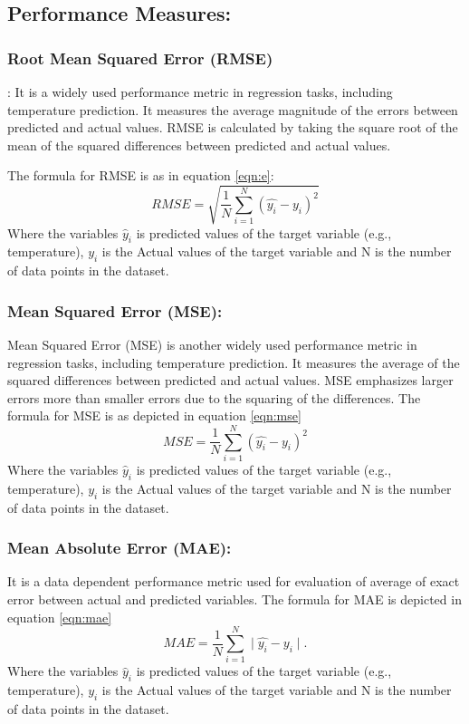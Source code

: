 \documentclass[sn-mathphys,Numbered]{sn-jnl}
\theoremstyle{thmstyleone}
\theoremstyle{thmstyletwo}
\theoremstyle{thmstylethree}
\begin{document}
\subsection {Performance Measures:}
\subsubsection{Root Mean Squared Error (RMSE)}:
It is a widely used performance metric in regression tasks, including temperature prediction. It measures the average magnitude of the errors between predicted and actual values. RMSE is calculated by taking the square root of the mean of the squared differences between predicted and actual values.

The formula for RMSE is as in equation \ref{eqn:e}:
\begin{equation}
\label{eqn:e}
RMSE = \sqrt {\frac{1}{N} \sum_{i=1}^{N} (\hat{y_{i}} - y_{i})^2}
\end{equation}
Where the variables $\hat{y}_i$ is predicted values of the target variable (e.g., temperature), $y_i$ is the Actual values of the target variable and N is the number of data points in the dataset.
\subsubsection {Mean Squared Error (MSE):}
Mean Squared Error (MSE) is another widely used performance metric in regression tasks, including temperature prediction. It measures the average of the squared differences between predicted and actual values. MSE emphasizes larger errors more than smaller errors due to the squaring of the differences.
The formula for MSE is as depicted in equation \ref{eqn:mse}
\begin{equation}
\label{eqn:mse}
MSE = \frac{1}{N} \sum_{i=1}^{N} (\hat{y_{i}} - y_{i})^2
\end{equation}
Where the variables $\hat{y}_i$ is predicted values of the target variable (e.g., temperature), $y_i$ is the Actual values of the target variable and N is the number of data points in the dataset.

\subsubsection {Mean Absolute Error (MAE):} It is a data dependent performance metric used for evaluation of average of exact error between actual and predicted variables. The formula for MAE is depicted in equation \ref{eqn:mae}
\begin{equation}
\label{eqn:mae}
MAE = \frac{1}{N} \sum_{i=1}^{N} \mid\hat{y_{i}} - y_{i}\mid .
\end{equation}
Where the variables $\hat{y}_i$ is predicted values of the target variable (e.g., temperature), $y_i$ is the Actual values of the target variable and N is the number of data points in the dataset.
\end{document}
